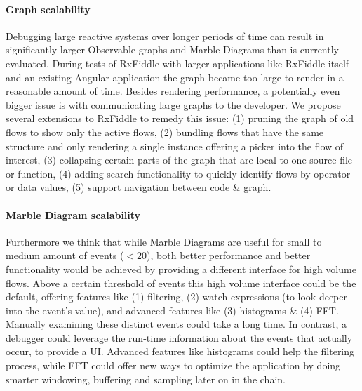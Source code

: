 \paragraph{Graph scalability}
Debugging large reactive systems over longer periods of time can result in significantly larger Observable graphs and Marble Diagrams than is currently evaluated. During tests of RxFiddle with larger applications like RxFiddle itself and an existing Angular application the graph became too large to render in a reasonable amount of time. Besides rendering performance, a potentially even bigger issue is with communicating large graphs to the developer. We propose several extensions to RxFiddle to remedy this issue: (1) pruning the graph of old flows to show only the active flows, (2) bundling flows that have the same structure and only rendering a single instance offering a picker into the flow of interest, (3) collapsing certain parts of the graph that are local to one source file or function, (4) adding search functionality to quickly identify flows by operator or data values, (5) support navigation between code \& graph.

\paragraph{Marble Diagram scalability}
Furthermore we think that while Marble Diagrams are useful for small to medium amount of events ($< 20$), both better performance and better functionality would be achieved by providing a different interface for high volume flows. Above a certain threshold of events this high volume interface could be the default, offering features like (1) filtering, (2) watch expressions (to look deeper into the event's value), and advanced features like (3) histograms \& (4) FFT. Manually examining these distinct events could take a long time. In contrast, a debugger could leverage the run-time information about the events that actually occur, to provide a UI. Advanced features like histograms could help the filtering process, while FFT could offer new ways to optimize the application by doing smarter windowing, buffering and sampling later on in the chain.

